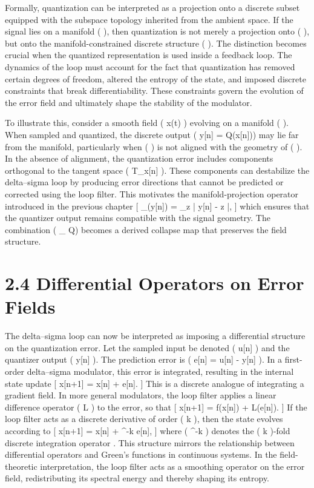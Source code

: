 Formally, quantization can be interpreted as a projection onto a discrete subset equipped with the subspace topology inherited from the ambient space. If the signal lies on a manifold (  ), then quantization is not merely a projection onto ( \Lambda \subset {}), but onto the manifold-constrained discrete structure ( \Lambda \cap {} ). The distinction becomes crucial when the quantized representation is used inside a feedback loop. The dynamics of the loop must account for the fact that quantization has removed certain degrees of freedom, altered the entropy of the state, and imposed discrete constraints that break differentiability. These constraints govern the evolution of the error field and ultimately shape the stability of the modulator.

To illustrate this, consider a smooth field ( x(t) ) evolving on a manifold (  ). When sampled and quantized, the discrete output ( y[n] = Q(x[n])) may lie far from the manifold, particularly when ( \Lambda ) is not aligned with the geometry of (  ). In the absence of alignment, the quantization error includes components orthogonal to the tangent space ( T_{x[n]} ). These components can destabilize the delta--sigma loop by producing error directions that cannot be predicted or corrected using the loop filter. This motivates the manifold-projection operator introduced in the previous chapter
[
\Pi_{}(y[n]) = \arg\min_{z \in {}} | y[n] - z |,
]
which ensures that the quantizer output remains compatible with the signal geometry. The combination ( \Pi_{} \circ Q) becomes a derived collapse map that preserves the field structure.

\section*{2.4 Differential Operators on Error Fields}

The delta--sigma loop can now be interpreted as imposing a differential structure on the quantization error. Let the sampled input be denoted ( u[n] ) and the quantizer output ( y[n] ). The prediction error is ( e[n] = u[n] - y[n] ). In a first-order delta--sigma modulator, this error is integrated, resulting in the internal state update
[
x[n+1] = x[n] + e[n].
]
This is a discrete analogue of integrating a gradient field. In more general modulators, the loop filter applies a linear difference operator ( L ) to the error, so that
[
x[n+1] = f(x[n]) + L(e[n]).
]
If the loop filter acts as a discrete derivative of order ( k ), then the state evolves according to
[
x[n+1] = x[n] + \Delta^{-k} e[n],
]
where ( \Delta^{-k} ) denotes the ( k )-fold discrete integration operator \citep{butterworth1988discrete}. This structure mirrors the relationship between differential operators and Green's functions in continuous systems. In the field-theoretic interpretation, the loop filter acts as a smoothing operator on the error field, redistributing its spectral energy and thereby shaping its entropy.

